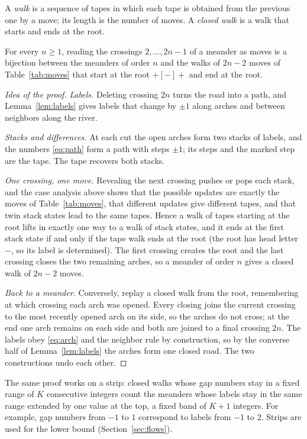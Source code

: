 A \emph{walk} is a sequence of tapes in which each tape is obtained from the previous one by a move; its length is
the number of moves. A \emph{closed walk} is a walk that starts and ends at the root.

\begin{theorem}\label{thm:tape}
For every $n\ge1$, reading the crossings $2,\ldots,2n-1$ of a meander as moves is a bijection between the meanders of
order $n$ and the walks of $2n-2$ moves of Table~\ref{tab:moves} that start at the root $+[-]+$ and end at the root.
\end{theorem}

\begin{proof}[Idea of the proof]
\emph{Labels.} Deleting crossing $2n$ turns the road into a path, and Lemma~\ref{lem:labels} gives labels that change
by $\pm1$ along arches and between neighbors along the river.

\emph{Stacks and differences.} At each cut the open arches form two stacks of labels, and the numbers
\eqref{eq:path} form a path with steps $\pm1$; its steps and the marked step are the tape. The tape recovers both
stacks.

\emph{One crossing, one move.} Revealing the next crossing pushes or pops each stack, and the case analysis above
shows that the possible updates are exactly the moves of Table~\ref{tab:moves}, that different updates give different
tapes, and that twin stack states lead to the same tapes. Hence a walk of tapes starting at the root lifts in exactly
one way to a walk of stack states, and it ends at the first stack state if and only if the tape walk ends at the
root (the root has head letter $-$, so its label is determined). The first crossing creates the root and the last
crossing closes the two remaining arches, so a meander of order $n$ gives a closed walk of $2n-2$ moves.

\emph{Back to a meander.} Conversely, replay a closed walk from the root, remembering at which crossing each arch was
opened. Every closing joins the current crossing to the most recently opened arch on its side, so the arches do not
cross; at the end one arch remains on each side and both are joined to a final crossing $2n$. The labels obey
\eqref{eq:arch} and the neighbor rule by construction, so by the converse half of Lemma~\ref{lem:labels} the arches
form one closed road. The two constructions undo each other.
\end{proof}

The same proof works on a strip: closed walks whose gap numbers stay in a fixed range of $K$ consecutive integers
count the meanders whose labels stay in the same range extended by one value at the top, a fixed band of $K+1$
integers. For example, gap numbers from $-1$ to $1$ correspond to labels from $-1$ to $2$. Strips are used for the
lower bound (Section~\ref{sec:flows}).

